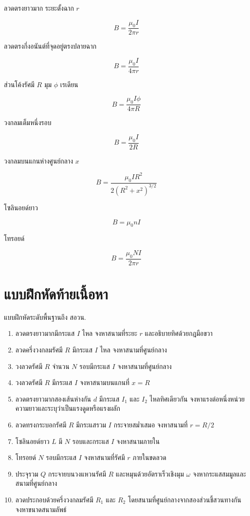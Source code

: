 \begin{tcolorbox}[title={ตารางเลือกสมการอย่างรวดเร็ว}]
ลวดตรงยาวมาก ระยะตั้งฉาก $r$

\[
B=\frac{\mu_0I}{2\pi r}
\]

ลวดตรงกึ่งอนันต์ที่จุดอยู่ตรงปลายฉาก

\[
B=\frac{\mu_0I}{4\pi r}
\]

ส่วนโค้งรัศมี $R$ มุม $\phi$ เรเดียน

\[
B=\frac{\mu_0I\phi}{4\pi R}
\]

วงกลมเต็มหนึ่งรอบ

\[
B=\frac{\mu_0I}{2R}
\]

วงกลมบนแกนห่างศูนย์กลาง $x$

\[
B=\frac{\mu_0IR^2}{2(R^2+x^2)^{3/2}}
\]

โซลินอยด์ยาว

\[
B=\mu_0nI
\]

โทรอยด์

\[
B=\frac{\mu_0NI}{2\pi r}
\]
\end{tcolorbox}

\section{แบบฝึกหัดท้ายเนื้อหา}

\begin{exercisebox}{แบบฝึกหัดระดับพื้นฐานถึง สอวน.}
\begin{enumerate}
    \item ลวดตรงยาวมากมีกระแส $I$ ไหล จงหาสนามที่ระยะ $r$ และอธิบายทิศด้วยกฎมือขวา

    \item ลวดครึ่งวงกลมรัศมี $R$ มีกระแส $I$ ไหล จงหาสนามที่ศูนย์กลาง

    \item วงลวดรัศมี $R$ จำนวน $N$ รอบมีกระแส $I$ จงหาสนามที่ศูนย์กลาง

    \item วงลวดรัศมี $R$ มีกระแส $I$ จงหาสนามบนแกนที่ $x=R$

    \item ลวดตรงยาวมากสองเส้นห่างกัน $d$ มีกระแส $I_1$ และ $I_2$ ไหลทิศเดียวกัน จงหาแรงต่อหนึ่งหน่วยความยาวและระบุว่าเป็นแรงดูดหรือแรงผลัก

    \item ลวดทรงกระบอกรัศมี $R$ มีกระแสรวม $I$ กระจายสม่ำเสมอ จงหาสนามที่ $r=R/2$

    \item โซลินอยด์ยาว $L$ มี $N$ รอบและกระแส $I$ จงหาสนามภายใน

    \item โทรอยด์ $N$ รอบมีกระแส $I$ จงหาสนามที่รัศมี $r$ ภายในขดลวด

    \item ประจุรวม $Q$ กระจายบนวงแหวนรัศมี $R$ และหมุนด้วยอัตราเร็วเชิงมุม $\omega$ จงหากระแสสมมูลและสนามที่ศูนย์กลาง

    \item ลวดประกอบด้วยครึ่งวงกลมรัศมี $R_1$ และ $R_2$ โดยสนามที่ศูนย์กลางจากสองส่วนชี้สวนทางกัน จงหาขนาดสนามลัพธ์
\end{enumerate}
\end{exercisebox}

